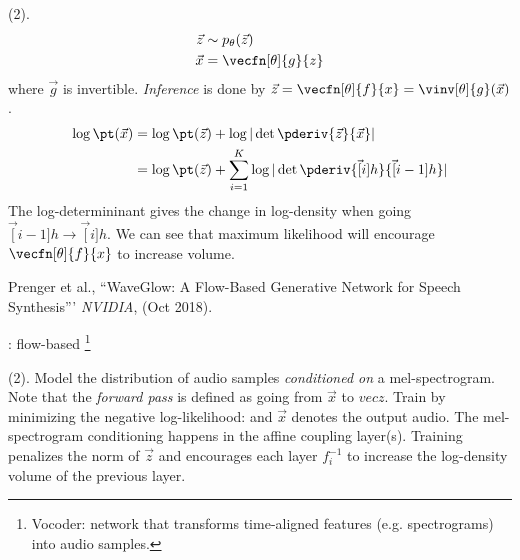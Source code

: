 \documentclass[11pt]{article}
\begin{document}
 (2). 
\begin{align}
\vec z
&\sim p_{\theta}(\vec z) \\
\vec x 
&= \vecfn[\theta]{g}{z}
\end{align}
where $\vec g$ is invertible. \textit{Inference} is done by $\vec z =\vecfn[\theta]{f}{x} = \vinv[\theta]{g}(\vec x)$. 
\begin{align}
\log	\pt (\vec x)
&= \log \pt (\vec z) + \log | \det \pderiv{\vec z}{\vec x} | \\
&= \log \pt (\vec z) + \sum_{i=1}^K \log | \det \pderiv{\vec[i]{h}}{\vec[i-1]{h}} |
\end{align}
The log-determininant gives the change in log-density when going $\vec[i-1]{h} \rightarrow \vec[i]{h}$. We can see that maximum likelihood will encourage $\vecfn[\theta]{f}{x}$ to increase volume.



\vspace{-1em}
{\footnotesize Prenger et al., ``WaveGlow: A Flow-Based Generative Network for Speech Synthesis''' \textit{NVIDIA}, (Oct 2018).}


: flow-based \footnote{Vocoder: network that transforms time-aligned features (e.g. spectrograms) into audio samples.}


 (2). Model the distribution of audio samples \textit{conditioned on} a mel-spectrogram. Note that the \textit{forward pass} is defined as going from $\vec x$ to $vec z$. Train by minimizing the negative log-likelihood:
and $\vec x$ denotes the output audio. The mel-spectrogram conditioning happens in the affine coupling layer(s). Training penalizes the norm of $\vec z$ and encourages each layer $f_i^{-1}$ to increase the log-density volume of the previous layer. 
\end{document}
